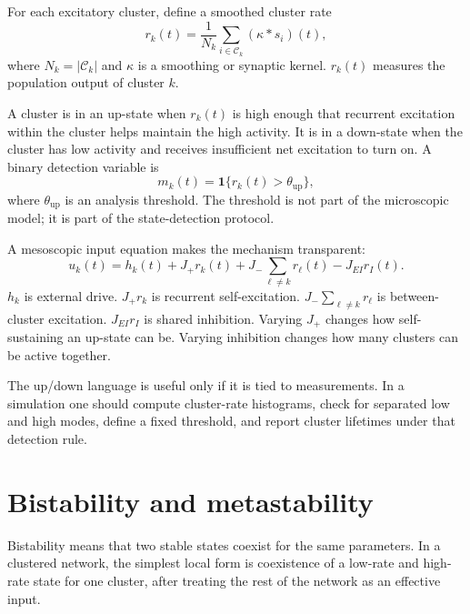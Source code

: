 For each excitatory cluster, define a smoothed cluster rate
%
\begin{equation}
  r_k(t)
  =
  \frac{1}{N_k}\sum_{i\in\mathcal{C}_k}(\kappa*s_i)(t),
  \label{eq:lkd-smoothed-cluster-rate}
\end{equation}
%
where $N_k=|\mathcal{C}_k|$ and $\kappa$ is a smoothing or synaptic kernel. $r_k(t)$ measures the population output of cluster $k$.

A cluster is in an up-state when $r_k(t)$ is high enough that recurrent excitation within the cluster helps maintain the high activity. It is in a down-state when the cluster has low activity and receives insufficient net excitation to turn on. A binary detection variable is
%
\begin{equation}
  m_k(t)
  =
  \mathbf{1}\{r_k(t)>\theta_{\mathrm{up}}\},
  \label{eq:cluster-up-indicator}
\end{equation}
%
where $\theta_{\mathrm{up}}$ is an analysis threshold. The threshold is not part of the microscopic model; it is part of the state-detection protocol.

A mesoscopic input equation makes the mechanism transparent:
%
\begin{equation}
  u_k(t)
  =
  h_k(t)
  +
  J_+ r_k(t)
  +
  J_-\sum_{\ell\ne k} r_\ell(t)
  -
  J_{EI}r_I(t).
  \label{eq:cluster-effective-input}
\end{equation}
%
$h_k$ is external drive. $J_+r_k$ is recurrent self-excitation. $J_-\sum_{\ell\ne k}r_\ell$ is between-cluster excitation. $J_{EI}r_I$ is shared inhibition. Varying $J_+$ changes how self-sustaining an up-state can be. Varying inhibition changes how many clusters can be active together.

The up/down language is useful only if it is tied to measurements. In a simulation one should compute cluster-rate histograms, check for separated low and high modes, define a fixed threshold, and report cluster lifetimes under that detection rule.

\section{Bistability and metastability}
\label{sec:bistability-and-metastability}

Bistability means that two stable states coexist for the same parameters. In a clustered network, the simplest local form is coexistence of a low-rate and high-rate state for one cluster, after treating the rest of the network as an effective input.

